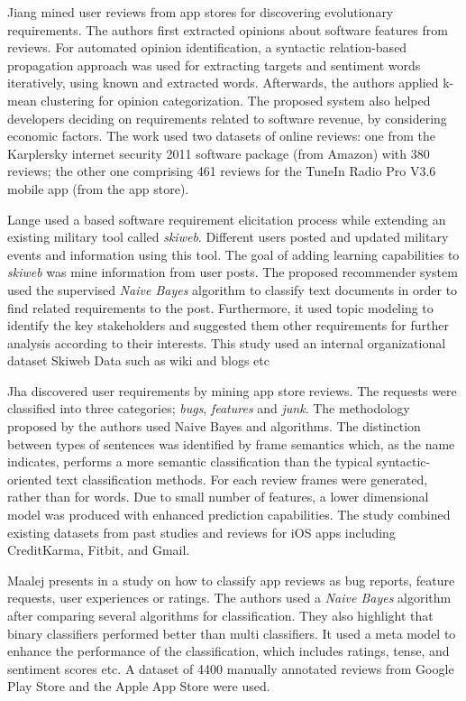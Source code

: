 Jiang \etal \cite{Jiang:2014} mined user reviews from app stores for discovering
evolutionary requirements. The authors first extracted opinions about software
features from reviews. For automated opinion identification, a syntactic
relation-based propagation approach was used for extracting targets and
sentiment words iteratively, using known and extracted words. Afterwards, the
authors applied k-mean clustering for opinion categorization. The proposed
system also helped developers deciding on requirements related to software
revenue, by considering economic factors. The work used two datasets of online
reviews: one from the Karplersky internet security 2011 software package (from Amazon) with 380
reviews; the other one comprising 461 reviews for the TuneIn Radio Pro V3.6
mobile app (from the app store).

Lange \etal\cite{Douglas:S2008} used a \ML based software
requirement elicitation process while extending an existing military tool called
\emph{skiweb}.  Different users posted and updated military events and
information using this tool. The goal of adding learning capabilities to
\emph{skiweb} was mine information from user posts. The proposed recommender
system used the supervised \emph{Naive Bayes} algorithm to classify text
documents in order to find related requirements to the post. Furthermore, it used topic
modeling to identify the key stakeholders and suggested them other requirements
for further analysis according to their interests. This study used an internal
organizational dataset Skiweb Data such as wiki and blogs etc

Jha \etal \cite{Jha:2017} discovered user requirements by mining app store
reviews. The requests were classified into three categories; \emph{bugs},
\emph{features} and \emph{junk}. The methodology proposed by the authors used
Naive Bayes and \SVM algorithms. The distinction between types of sentences was
identified by frame semantics  which, as the name indicates, performs
a more semantic classification than the typical syntactic-oriented text
classification methods. For each review frames were generated, rather than for
words. Due to small number of features, a lower dimensional model was
produced with enhanced prediction capabilities. The study combined existing
datasets from past studies and reviews for iOS apps including CreditKarma,
Fitbit, and Gmail.

Maalej \etal presents in \cite{Maalej} a study on how to classify app reviews as
bug reports, feature requests, user experiences or ratings. The authors used a
\emph{Naive Bayes} algorithm after comparing several algorithms for
classification. They also highlight that binary classifiers performed better
than multi classifiers. It used a meta model to enhance the performance of the
classification, which includes ratings, tense, and sentiment scores etc. A
dataset of 4400 manually annotated reviews from Google Play Store and the Apple
App Store were used.

